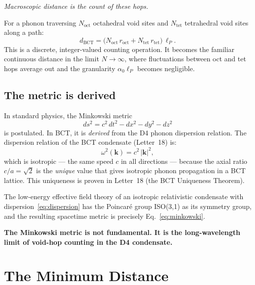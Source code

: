 \documentclass[aps,prl,twocolumn,showpacs,preprintnumbers]{revtex4-2}
\newcommand{\roct}{r_{\mathrm{oct}}}
\newcommand{\rtet}{r_{\mathrm{tet}}}
\newcommand{\azero}{\alpha_0}
\newcommand{\lP}{\ell_P}
\newcommand{\dBCT}{d_{\mathrm{BCT}}}
\begin{document}
\emph{Macroscopic distance is the count of these hops.}

For a phonon traversing $N_{\mathrm{oct}}$ octahedral void sites
and $N_{\mathrm{tet}}$ tetrahedral void sites along a path:
\begin{equation}
  \dBCT = \bigl(N_{\mathrm{oct}}\,\roct + N_{\mathrm{tet}}\,\rtet\bigr)
  \,\lP.
  \label{eq:dBCT}
\end{equation}
This is a discrete, integer-valued counting operation.
It becomes the familiar continuous distance in the limit
$N \to \infty$, where fluctuations between oct and tet hops
average out and the granularity $\azero\lP$ becomes negligible.

\subsection{The metric is derived}

In standard physics, the Minkowski metric
\begin{equation}
  ds^2 = c^2\,dt^2 - dx^2 - dy^2 - dz^2
  \label{eq:minkowski}
\end{equation}
is postulated. In BCT, it is \emph{derived} from the D4 phonon
dispersion relation. The dispersion relation of the BCT condensate
(Letter~18) is:
\begin{equation}
  \omega^2(\mathbf{k}) = c^2\,|\mathbf{k}|^2,
  \label{eq:dispersion}
\end{equation}
which is isotropic --- the same speed $c$ in all directions ---
because the axial ratio $c/a = \sqrt{2}$ is the \emph{unique}
value that gives isotropic phonon propagation in a BCT lattice.
This uniqueness is proven in Letter~18 (the BCT Uniqueness Theorem).

The low-energy effective field theory of an isotropic relativistic
condensate with dispersion~\eqref{eq:dispersion} has the Poincar\'e
group ISO(3,1) as its symmetry group, and the resulting
spacetime metric is precisely Eq.~\eqref{eq:minkowski}.

\textbf{The Minkowski metric is not fundamental. It is the
long-wavelength limit of void-hop counting in the D4 condensate.}

\section{The Minimum Distance}
\end{document}
